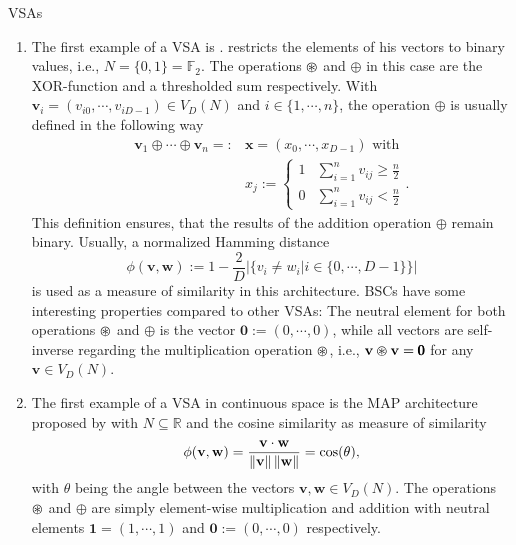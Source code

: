 \begin{ex} \aclp{VSA}
	\label{ex:VSAs}
	\begin{enumerate}
		\item The first example of a \ac{VSA} is .
            \textcite{Kanerva2009} restricts the elements of his vectors to binary values, i.e., $N=\{0,1\} = \mathbb{F}_{2}$.
		The operations $\varoast$ and $\oplus$ in this case are the XOR-function and a thresholded sum respectively.
		With $ \mathbf{v}_{i} = \left(v_{i 0}, \cdots, v_{i D-1}\right) \in V_{D}(N)$ and  $i \in \{1, \cdots, n\}$, the operation $\oplus$ is usually defined in the following way
		\begin{align*}
			\mathbf{v}_{1} \oplus \cdots \oplus \mathbf{v}_{n} =: &\mathbf{x} = \left(x_{0}, \cdots, x_{D-1}\right) \textrm{ with } \\
			&x_{j}:= \begin{cases}
				1 & \sum\limits_{i=1}^{n} v_{ij} \geq \frac{n}{2} \\
				0 & \sum\limits_{i=1}^{n} v_{ij} < \frac{n}{2}
			\end{cases}.
		\end{align*}
		This definition ensures, that the results of the addition operation $\oplus$ remain binary.
		Usually, a normalized Hamming distance
		\[
		\phi( \mathbf{v}, \mathbf{w}) := 1 - \frac{2}{D} \left| \{ v_{i} \neq w_{i} | i \in \{0, \cdots, D-1\} \} \right|
		\]
		is used as a measure of similarity in this architecture.
		\acp{BSC} have some interesting properties compared to other \acp{VSA}:
		The neutral element for both operations $\varoast$ and $\oplus$ is the vector $\pmb{0} := \left(0, \cdots, 0\right)$, while all vectors are self-inverse regarding the multiplication operation $\varoast$, i.e., $ \mathbf{v} \varoast \mathbf{v} = \pmb{0}$ for any $ \mathbf{v} \in V_{D}(N)$.

		\item The first example of a \ac{VSA} in continuous space is the \acrfull{MAP} architecture proposed by \textcite{Gayler1998} with $N \subseteq \mathbb{R}$ and the cosine similarity as measure of similarity
		\[
		\phi( \mathbf{v}, \mathbf{w}) = \frac{ \mathbf{v} \cdot \mathbf{w}}{\left\|  \mathbf{v} \right\|\left\|  \mathbf{w} \right\|}=\cos(\theta),
		\]
		with $\theta$ being the angle between the vectors $ \mathbf{v}, \mathbf{w} \in V_{D}(N)$.
		The operations $\varoast$ and $\oplus$ are simply element-wise multiplication and addition with neutral elements $\pmb{1}=\left(1, \cdots, 1\right)$ and $\pmb{0} := \left(0, \cdots, 0\right)$ respectively.


\end{enumerate}
\end{ex}
